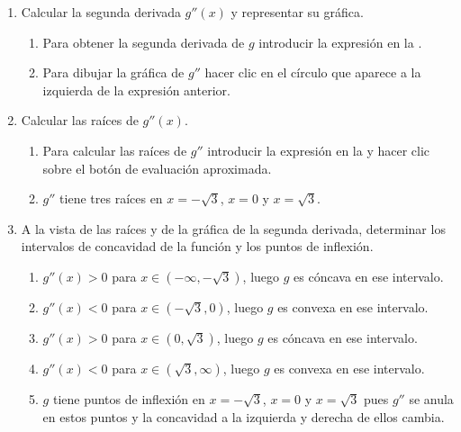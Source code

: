\begin{enumerate}[leftmargin=*]
\begin{enumerate}
      \item Calcular la segunda derivada $g''(x)$ y representar su gráfica.
            \begin{indication}
            \begin{enumerate}
            \item Para obtener la segunda derivada de $g$ introducir la expresión  en la .
            \item Para dibujar la gráfica de $g''$ hacer clic en el círculo que aparece a la izquierda de la expresión anterior.
            \end{enumerate}
            \end{indication}

      \item Calcular las raíces de $g''(x).$
            \begin{indication}
            \begin{enumerate}
            \item Para calcular las raíces de $g''$ introducir la expresión  en la  y hacer clic sobre el botón de evaluación aproximada.
            \item $g''$ tiene tres raíces en $x=-\sqrt{3}$, $x=0$ y $x=\sqrt{3}$.
            \end{enumerate}
            \end{indication}

      \item A la vista de las raíces y de la gráfica de la segunda derivada, determinar los intervalos de concavidad de la función y los puntos de inflexión.
            \begin{indication}
            \begin{enumerate}
            \item $g''(x)>0$ para $x\in (-\infty, -\sqrt{3})$, luego $g$ es cóncava en ese intervalo.
            \item $g''(x)<0$ para $x\in (-\sqrt{3}, 0)$, luego $g$ es convexa en ese intervalo.
            \item $g''(x)>0$ para $x\in (0, \sqrt{3})$, luego $g$ es cóncava en ese intervalo.
            \item $g''(x)<0$ para $x\in (\sqrt{3}, \infty)$, luego $g$ es convexa en ese intervalo.
            \item $g$ tiene puntos de inflexión en $x=-\sqrt{3}$, $x=0$ y $x=\sqrt{3}$ pues $g''$ se anula en estos puntos y la concavidad a la izquierda y derecha de ellos cambia.
            \end{enumerate}
            \end{indication}
      \end{enumerate}

\end{enumerate}


